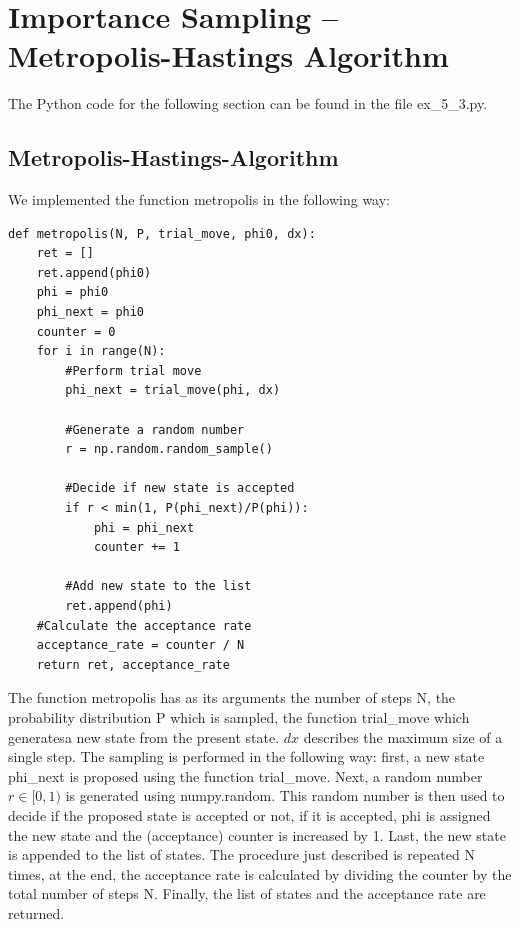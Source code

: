 \documentclass[a4paper,10pt,bibtotoc]{scrartcl}
\begin{document}
\newpage
\section{Importance Sampling -- Metropolis-Hastings Algorithm}
The Python code for the following section can be found in the file ex\_5\_3.py.
\subsection{Metropolis-Hastings-Algorithm}
We implemented the function metropolis in the following way:
\begin{lstlisting}
def metropolis(N, P, trial_move, phi0, dx):
    ret = []
    ret.append(phi0)
    phi = phi0
    phi_next = phi0
    counter = 0
    for i in range(N):
        #Perform trial move
        phi_next = trial_move(phi, dx)
        
        #Generate a random number
        r = np.random.random_sample()
        
        #Decide if new state is accepted
        if r < min(1, P(phi_next)/P(phi)):
            phi = phi_next
            counter += 1
        
        #Add new state to the list
        ret.append(phi)
    #Calculate the acceptance rate
    acceptance_rate = counter / N
    return ret, acceptance_rate
\end{lstlisting}
The function metropolis has as its arguments the number of steps N, the probability distribution P which is sampled, the function trial\_move which generatesa new state from the present state. 
$dx$ describes the maximum size of a single step.
The sampling is performed in the following way: first, a new state phi\_next is proposed using the function trial\_move.
Next, a random number $r\in[0,1)$ is generated using numpy.random.
This random number is then used to decide if the proposed state is accepted or not, if it is accepted, phi is assigned the new state and the (acceptance) counter is increased by 1.
Last, the new state is appended to the list of states.
The procedure just described is repeated N times, at the end, the acceptance rate is calculated by dividing the counter by the total number of steps N.
Finally, the list of states and the acceptance rate are returned.
\end{document}
